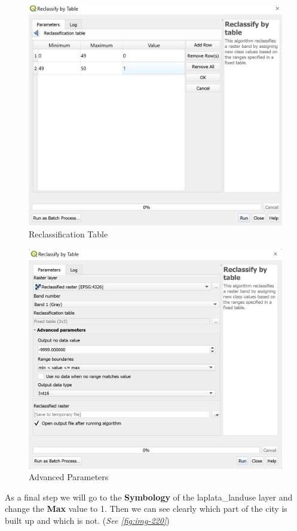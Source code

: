 \documentclass[
]{book}
\begin{document}
\begin{figure}

{\centering \includegraphics[width=0.7\linewidth]{images/reclass2} 

}

\caption{Reclassification Table}\label{fig:img-218}
\end{figure}
\begin{figure}

{\centering \includegraphics[width=0.7\linewidth]{images/reclass3} 

}

\caption{Advanced Parameters}\label{fig:img-219}
\end{figure}

As a final step we will go to the \textbf{Symbology} of the {laplata\_landuse} layer and change the \textbf{Max} value to 1.
Then we can see clearly which part of the city is built up and which is not. (\emph{See \ref{fig:img-220}})
\end{document}
